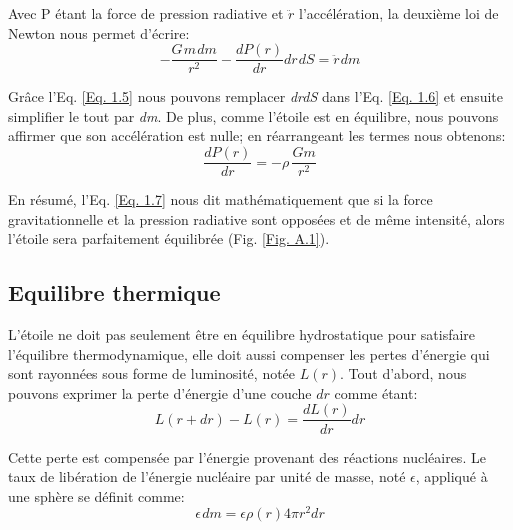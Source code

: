 Avec P étant la force de pression radiative et $\ddot{r}$ l'accélération, la deuxième loi de Newton nous permet
d'écrire\footnotemark[3]:\begin{equation}-\dfrac{G\hspace{1pt}m\hspace{1pt}dm}{r^{2}}-\dfrac{dP(r)}{dr}dr\hspace{1pt}dS=\ddot r\hspace{1pt}dm\label{Eq. 1.6}\end{equation}

Grâce l'Eq. \ref{Eq. 1.5} nous pouvons remplacer \textit{dr\hspace{1pt}dS} dans l'Eq. \ref{Eq. 1.6} et ensuite simplifier le tout par \textit{dm}. De plus, comme l'étoile est en équilibre, nous pouvons affirmer que son accélération est nulle; en réarrangeant les termes nous obtenons:\begin{equation}\boxed{\dfrac{dP(r)}{dr}=-\rho\hspace{2pt}\frac{Gm}{r^{2}}}\label{Eq. 1.7}\end{equation}

En résumé, l'Eq. \ref{Eq. 1.7} nous dit mathématiquement que si la force gravitationnelle et la pression radiative sont opposées et de même intensité, alors l'étoile sera parfaitement équilibrée (Fig. \ref{Fig. A.1}).


\subsection{Equilibre thermique}\label{1.1.3}

L'étoile ne doit pas seulement être en équilibre hydrostatique pour satisfaire l'équilibre thermodynamique, elle doit aussi compenser les pertes d'énergie qui sont rayonnées sous forme de luminosité, notée $L(r)$. Tout d'abord, nous pouvons exprimer la perte d'énergie d'une couche $dr$ comme étant:\begin{equation}L(r+dr)-L(r)=\dfrac{dL(r)}{dr}dr\label{Eq. 1.8}\end{equation}

Cette perte est compensée par l'énergie provenant des réactions nucléaires. Le taux de libération de l'énergie nucléaire par unité de masse, noté $\epsilon$, appliqué à une sphère se définit comme:\begin{equation}\epsilon\hspace{1pt}dm=\epsilon\rho(r)4\pi r^{2}dr\label{Eq. 1.9}\end{equation}

